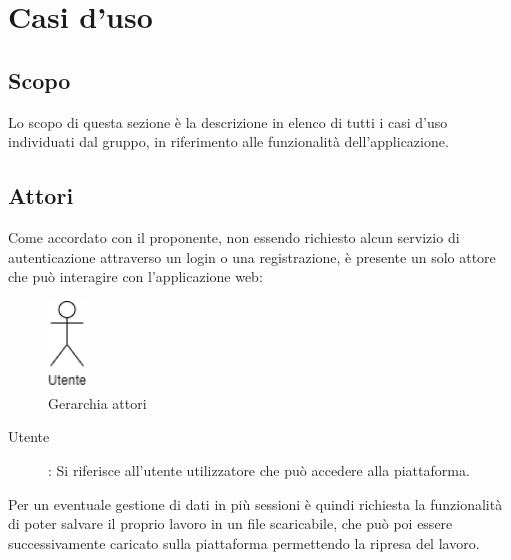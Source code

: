 \section{Casi d'uso}
\subsection{Scopo}
Lo scopo di questa sezione è la descrizione in elenco di tutti i casi d'uso individuati dal gruppo, in riferimento alle funzionalità dell'applicazione.
\subsection{Attori}
Come accordato con il proponente, non essendo richiesto alcun servizio di autenticazione attraverso un login o una registrazione, è presente un solo attore che può interagire con l'applicazione web:

\begin{figure}[h]
\includegraphics[width=1cm]{section/Images/Utente.png}
\centering
\caption{Gerarchia attori}
\end{figure}

\begin{description}
\item[Utente]:
Si riferisce all'utente utilizzatore che può accedere alla piattaforma.
\end{description}
Per un eventuale gestione di dati in più sessioni è quindi richiesta la funzionalità di poter salvare il proprio lavoro in un file scaricabile, che può poi essere successivamente caricato sulla piattaforma permettendo la ripresa del lavoro.
